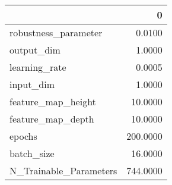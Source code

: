 \begin{tabular}{lr}
\toprule
{} &         0 \\
\midrule
robustness\_parameter   &    0.0100 \\
output\_dim             &    1.0000 \\
learning\_rate          &    0.0005 \\
input\_dim              &    1.0000 \\
feature\_map\_height     &   10.0000 \\
feature\_map\_depth      &   10.0000 \\
epochs                 &  200.0000 \\
batch\_size             &   16.0000 \\
N\_Trainable\_Parameters &  744.0000 \\
\bottomrule
\end{tabular}
